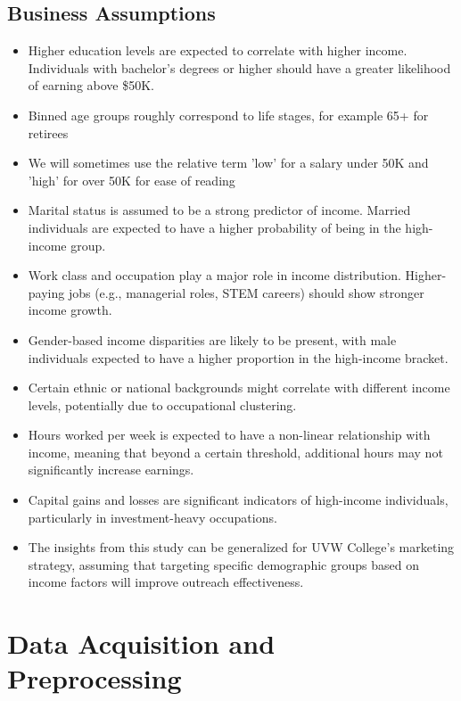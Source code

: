 \documentclass[journal,onecolumn]{IEEEtran}
\begin{document}
\subsection{Business Assumptions}
\begin{itemize}
    \item Higher education levels are expected to correlate with higher income. Individuals with bachelor’s degrees or higher should have a greater likelihood of earning above \$50K.
    \item Binned age groups roughly correspond to life stages, for example 65+ for retirees
    \item We will sometimes use the relative term 'low' for a salary under 50K and 'high' for over 50K for ease of reading
    \item Marital status is assumed to be a strong predictor of income. Married individuals are expected to have a higher probability of being in the high-income group.
    \item Work class and occupation play a major role in income distribution. Higher-paying jobs (e.g., managerial roles, STEM careers) should show stronger income growth.
    \item Gender-based income disparities are likely to be present, with male individuals expected to have a higher proportion in the high-income bracket.
    \item Certain ethnic or national backgrounds might correlate with different income levels, potentially due to occupational clustering.
    \item Hours worked per week is expected to have a non-linear relationship with income, meaning that beyond a certain threshold, additional hours may not significantly increase earnings.
    \item Capital gains and losses are significant indicators of high-income individuals, particularly in investment-heavy occupations.
    \item The insights from this study can be generalized for UVW College’s marketing strategy, assuming that targeting specific demographic groups based on income factors will improve outreach effectiveness.
\end{itemize}
\section{Data Acquisition and Preprocessing}
\end{document}
